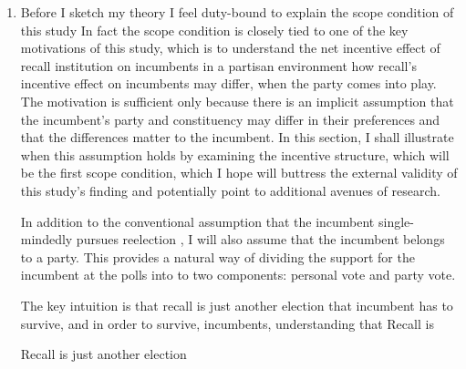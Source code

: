 \documentclass[hyphens, crop=false]{standalone}
\begin{document}
		\begin{enumerate}
			\item 
			Before I sketch my theory
			I feel duty-bound to explain the scope condition of this study
			In fact the scope condition is closely tied to one of the key motivations of this study,
			which is to understand the net incentive effect of recall institution
			on incumbents in a partisan environment
			how recall's incentive effect on incumbents may differ,
			when the party comes into play.
			The motivation is sufficient only because
			there is an implicit assumption that the incumbent's party and constituency
			may differ in their preferences and that the differences matter to the incumbent.
			In this section, I shall illustrate when this assumption holds by
			examining the incentive structure,
			which will be the first scope condition,
			which I hope will buttress the external validity of this study's finding
			and potentially point to additional avenues of research.
			
			In addition to the conventional assumption that the incumbent
			single-mindedly pursues reelection
			\autocite{mayhewCongressElectoralConnection1974},
			I will also assume that the incumbent belongs to a party.
			This provides a natural way of dividing the support for the incumbent at the polls
			into to two components:
			personal vote and party vote.
			
			
			
			The key intuition is that recall is just another election that incumbent has to survive,
			and in order to survive, incumbents, understanding that 
			Recall is 
			
			Recall is just another election
			

\end{enumerate}
\end{document}
